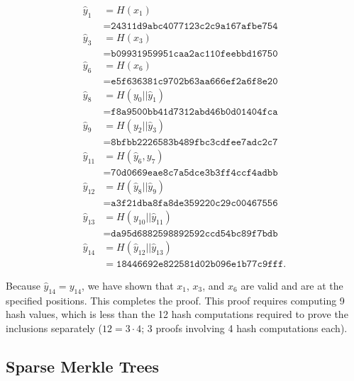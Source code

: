 \begin{example}
\begin{align}
    \hat{y}_{1} &= H(x_{1}) \nonumber\\
        &= \texttt{24311d9abc4077123c2c9a167afbe754}
            \nonumber\\
    \hat{y}_{3} &= H(x_{3}) \nonumber\\
        &= \texttt{b09931959951caa2ac110feebbd16750}
            \nonumber\\
    \hat{y}_{6} &= H(x_{6}) \nonumber\\
        &= \texttt{e5f636381c9702b63aa666ef2a6f8e20}
            \nonumber\\
    \hat{y}_{8} &= H(y_{0}||\hat{y}_{1}) \nonumber\\
        &= \texttt{f8a9500bb41d7312abd46b0d01404fca}
            \nonumber\\
    \hat{y}_{9} &= H(y_{2}||\hat{y}_{3}) \nonumber\\
        &= \texttt{8bfbb2226583b489fbc3cdfee7adc2c7}
            \nonumber\\
    \hat{y}_{11} &= H(\hat{y}_{6},y_{7}) \nonumber\\
        &= \texttt{70d0669eae8c7a5dce3b3ff4ccf4adbb}
            \nonumber\\
    \hat{y}_{12} &= H(\hat{y}_{8}||\hat{y}_{9}) \nonumber\\
        &= \texttt{a3f21dba8fa8de359220c29c00467556}
            \nonumber\\
    \hat{y}_{13} &= H(y_{10}||\hat{y}_{11}) \nonumber\\
        &= \texttt{da95d6882598892592ccd54bc89f7bdb}
            \nonumber\\
    \hat{y}_{14} &= H(\hat{y}_{12}||\hat{y}_{13}) \nonumber\\
        &= \texttt{18446692e822581d02b096e1b77c9fff}.
\end{align}

\noindent
Because $\hat{y}_{14} = y_{14}$, we have shown that
$x_{1}$, $x_{3}$, and $x_{6}$ are valid and are at the specified positions.
This completes the proof.
This proof requires computing 9 hash values,
which is less than the 12 hash computations required to prove the inclusions
separately ($12 = 3\cdot 4$; 3 proofs involving 4 hash computations each).
\end{example}

\subsection{Sparse Merkle Trees}

